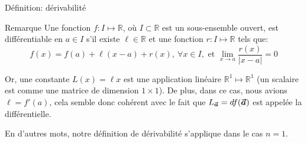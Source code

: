 \documentclass[a4paper]{article}
\begin{document}
\begin{parag}{Définition: dérivabilité}
\begin{subparag}{Remarque}
        Une fonction $f: I \mapsto \mathbb{R}$, où $I \subset \mathbb{R}$ est un sous-ensemble ouvert, est différentiable en $a \in I$ s'il existe $\ell \in \mathbb{R}$ et une fonction $r: I \mapsto \mathbb{R}$ tels que: 
        \[f\left(x\right) = f\left(a\right) + \ell\left(x - a\right) + r\left(x\right), \ \forall x \in I, \text{ et } \lim_{x \to a} \frac{r\left(x\right)}{\left|x - a\right|} = 0\]
        
        Or, une constante $L\left(x\right) = \ell x$ est une application linéaire $\mathbb{R}^{1} \mapsto \mathbb{R}^1$ (un scalaire est comme une matrice de dimension $1 \times 1$). De plus, dans ce cas, nous avions $\ell = f'\left(a\right)$, cela semble donc cohérent avec le fait que $L_{\bvec{a}} = df\left(\bvec{a}\right)$ est appelée la différentielle.

        En d'autres mots, notre définition de dérivabilité s'applique dans le cas $n = 1$. 
    \end{subparag}

\end{parag}
\end{document}
